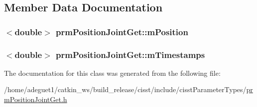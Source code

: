 \subsection{Member Data Documentation}
\hypertarget{classprm_position_joint_get_a9a7bd809fc2805e1902de89a108331ca}{
\subsubsection[{m\-Position}]{$<$double$>$ prm\-Position\-Joint\-Get\-::m\-Position\hspace{0.3cm}{\ttfamily [protected]}}}\label{classprm_position_joint_get_a9a7bd809fc2805e1902de89a108331ca}
\hypertarget{classprm_position_joint_get_a1a391f7e9a645609367916dc2ae7683c}{
\subsubsection[{m\-Timestamps}]{$<$double$>$ prm\-Position\-Joint\-Get\-::m\-Timestamps\hspace{0.3cm}{\ttfamily [protected]}}}\label{classprm_position_joint_get_a1a391f7e9a645609367916dc2ae7683c}


The documentation for this class was generated from the following file\-:\begin{DoxyCompactItemize}
\item 
/home/adeguet1/catkin\-\_\-ws/build\-\_\-release/cisst/include/cisst\-Parameter\-Types/\hyperlink{prm_position_joint_get_8h}{prm\-Position\-Joint\-Get.\-h}\end{DoxyCompactItemize}
